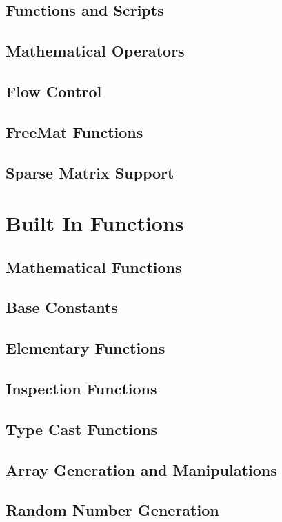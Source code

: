 \documentclass{book}
\begin{document}
\section{Functions and Scripts}

\section{Mathematical Operators}

\section{Flow Control}

\section{FreeMat Functions}

\section{Sparse Matrix Support}

\chapter{Built In Functions}
\section{Mathematical Functions}

\section{Base Constants}

\section{Elementary Functions}

\section{Inspection Functions}

\section{Type Cast Functions}

\section{Array Generation and Manipulations}

\section{Random Number Generation}

\end{document}
